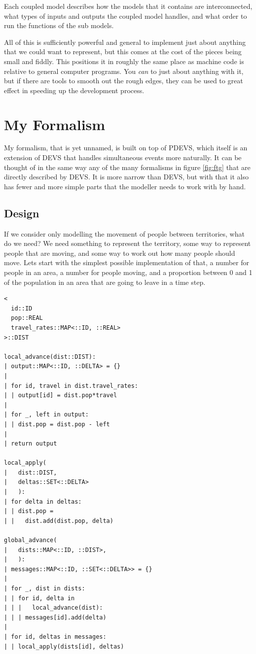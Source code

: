\documentclass[twocolumn]{article}
\begin{document}
Each coupled model describes how the models that it contains are interconnected, what types of inputs and outputs the coupled model handles, and what order to run the functions of the sub models.

All of this is sufficiently powerful and general to implement just about anything that we could want to represent, but this comes at the cost of the pieces being small and fiddly. This positions it in roughly the same place as machine code is relative to general computer programs. You \textit{can} to just about anything with it, but if there are tools to smooth out the rough edges, they can be used to great effect in speeding up the development process.

\section{My Formalism}

My formalism, that is yet unnamed, is built on top of PDEVS, which itself is an extension of DEVS that handles simultaneous events more naturally. It can be thought of in the same way any of the many formalisms in figure \ref{fig:ftg} that are directly described by DEVS. It is more narrow than DEVS, but with that it also has fewer and more simple parts that the modeller needs to work with by hand.

\subsection{Design}

If we consider only modelling the movement of people between territories, what do we need? We need something to represent the territory, some way to represent people that are moving, and some way to work out how many people should move. Lets start with the simplest possible implementation of that, a number for people in an area, a number for people moving, and a proportion between 0 and 1 of the population in an area that are going to leave in a time step.

\begin{verbatim}
<
  id::ID
  pop::REAL
  travel_rates::MAP<::ID, ::REAL>
>::DIST

local_advance(dist::DIST):
| output::MAP<::ID, ::DELTA> = {}
| 
| for id, travel in dist.travel_rates:
| | output[id] = dist.pop*travel
| 
| for _, left in output:
| | dist.pop = dist.pop - left
|
| return output

local_apply(
|   dist::DIST, 
|   deltas::SET<::DELTA>
|   ):
| for delta in deltas:
| | dist.pop = 
| |   dist.add(dist.pop, delta)

global_advance(
|   dists::MAP<::ID, ::DIST>,
|   ):
| messages::MAP<::ID, ::SET<::DELTA>> = {}
| 
| for _, dist in dists:
| | for id, delta in 
| | |   local_advance(dist):
| | | messages[id].add(delta)
| 
| for id, deltas in messages:
| | local_apply(dists[id], deltas)

\end{verbatim}
\end{document}
